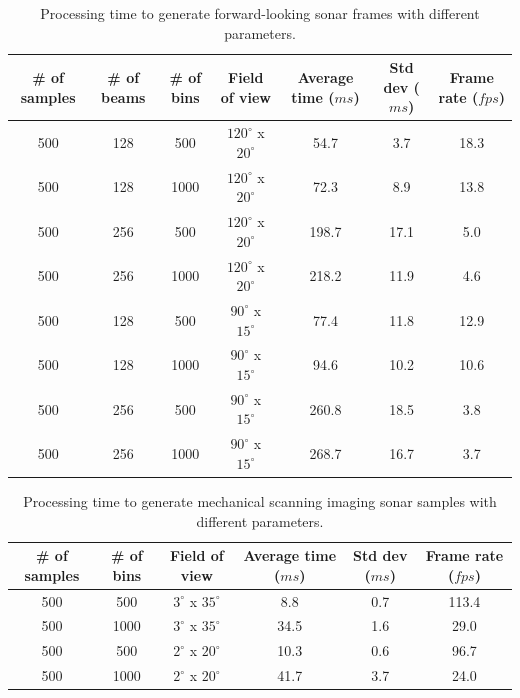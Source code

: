 \documentclass[final,5p,times]{elsarticle}
\begin{document}
\begin{table}[!h]
    \caption{Processing time to generate forward-looking sonar frames with different parameters.}
    \label{table:fls}
    \begin{center}
        \begin{tabular}{| c | c | c | c | c | c | c |}
            \hline
            \# of samples & \# of beams & \# of bins & Field of view & Average time ($ms$) & Std dev ($ms$) & Frame rate ($fps$) \\
            \hline
            500     & 128     & 500       & $120^{\circ}$ x $20^{\circ}$        & 54.7    & 3.7   & 18.3 \\ \hline
            500     & 128     & 1000      & $120^{\circ}$ x $20^{\circ}$        & 72.3	& 8.9   & 13.8 \\ \hline
            500     & 256     & 500       & $120^{\circ}$ x $20^{\circ}$        & 198.7	& 17.1  & 5.0  \\ \hline
            500     & 256     & 1000      & $120^{\circ}$ x $20^{\circ}$        & 218.2	& 11.9  & 4.6  \\ \hline
            500     & 128     & 500       & $90^{\circ}$ x $15^{\circ}$         & 77.4	& 11.8  & 12.9 \\ \hline
            500     & 128     & 1000      & $90^{\circ}$ x $15^{\circ}$         & 94.6	& 10.2  & 10.6 \\ \hline
            500     & 256     & 500       & $90^{\circ}$ x $15^{\circ}$         & 260.8	& 18.5  & 3.8  \\ \hline
            500     & 256     & 1000      & $90^{\circ}$ x $15^{\circ}$         & 268.7	& 16.7  & 3.7  \\ \hline
        \end{tabular}
    \end{center}
\end{table}

\begin{table}
    \caption{Processing time to generate mechanical scanning imaging sonar samples with different parameters.}
    \label{table:msis}
    \begin{center}
        \begin{tabular}{| c | c | c | c | c | c |}
            \hline
            \# of samples & \# of bins & Field of view & Average time ($ms$) & Std dev ($ms$) & Frame rate ($fps$) \\
            \hline
            500     & 500       & $3^{\circ}$ x $35^{\circ}$        & 8.8	    & 0.7  & 113.4 \\ \hline
            500     & 1000      & $3^{\circ}$ x $35^{\circ}$        & 34.5	& 1.6  & 29.0  \\ \hline
            500     & 500       & $2^{\circ}$ x $20^{\circ}$        & 10.3	& 0.6  & 96.7  \\ \hline
            500     & 1000      & $2^{\circ}$ x $20^{\circ}$        & 41.7	& 3.7  & 24.0  \\ \hline
        \end{tabular}
    \end{center}
\end{table}
\end{document}

